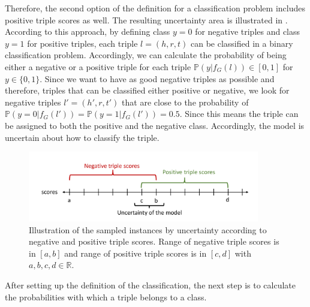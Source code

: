 Therefore, the second option of the definition for a classification problem includes positive triple scores as well.
The resulting uncertainty area is illustrated in .
According to this approach, by defining class $y = 0$ for negative triples and class $y = 1$ for positive triples, each triple $l = (h,r,t)$ can be classified in a binary classification problem.
Accordingly, we can calculate the probability of being either a negative or a positive triple for each triple $\mathbb{P}(y| f_G(l)) \in [0,1]$ for $y \in \{0,1\}$.
Since we want to have as good negative triples as possible and therefore, triples that can be classified either positive or negative, we look for negative triples $l' = (h',r,t')$ that are close to the probability of $\mathbb{P}(y = 0| f_G(l')) = \mathbb{P}(y = 1| f_G(l')) = 0.5$.
Since this means the triple can be assigned to both the positive and the negative class.
Accordingly, the model is uncertain about how to classify the triple.
\begin{figure}[H]
  \centering
    \includegraphics[width=0.9\textwidth]{figures/positiveVsNegativeApproach.pdf}
  \caption{Illustration of the sampled instances by uncertainty according to negative and positive triple scores.
  Range of negative triple scores is in $[a, b]$ and range of positive triple scores is in  $[c, d]$ with $a,b,c,d \in \mathbb{R}$.}
  \label{fig:positiveVsNegativeApproach}
\end{figure}
After setting up the definition of the classification, the next step is to calculate the probabilities with which a triple belongs to a class.
\clearpage